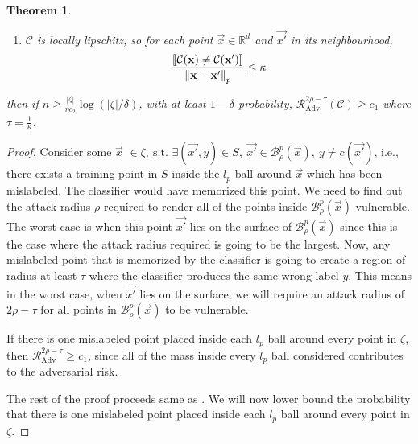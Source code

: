\documentclass[12pt, oneside]{book}
\newtheorem{theorem}{Theorem}
\begin{document}
\begin{theorem}
\begin{enumerate}
        \item $\mathcal{C}$ is locally lipschitz, so for each point $\vec{x} \in
        \mathbb{R}^d$ and $\vec{x'}$ in its neighbourhood,
            \begin{equation*}
                \frac{\llbracket \mathcal{C}({\mathbf{x}}) \neq \mathcal{C}({\mathbf{x'}}) \rrbracket}
                    {\mathrm{\left\lVert{\mathbf{x}} - {\mathbf{x'}}\right\rVert}_p} 
                \leq \kappa
            \end{equation*}
    \end{enumerate}
    then if $n \geq \frac{|\zeta|}{\eta c_2} \log (|\zeta|/\delta)$, with at
    least $1-\delta$ probability,
    $\mathcal{R}_{\text{Adv}}^{2\rho-\tau}(\mathcal{C}) \geq c_1$ where $\tau =
    \frac{1}{\kappa}$.
\end{theorem}
\begin{proof}
Consider some $\vec{x}$
$
\in \zeta, ~\text{s.t. } \exists (\vec{x'}, y) \in S,~\vec{x'}
\in \mathcal{B}_\rho^p(\vec{x}),~y \neq c(\vec{x'})
$,
i.e., there exists a training point in $S$ inside the $l_p$ ball around
$\vec{x}$ which has been mislabeled. The classifier would have memorized this
point. We need to find out the attack radius $\rho$ required to render all of
the points inside $\mathcal{B}_\rho^p(\vec{x})$ vulnerable. The worst case is
when this point $\vec{x'}$ lies on the surface of $\mathcal{B}_\rho^p(\vec{x})$
since this is the case where the attack radius required is going to be the
largest. Now, any mislabeled point that is memorized by the classifier is going
to create a region of radius at least $\tau$ where the classifier produces the
same wrong label $y$. This means in the worst case, when $\vec{x'}$ lies on the
surface, we will require an attack radius of $2\rho-\tau$ for all points in
$\mathcal{B}_\rho^p(\vec{x})$ to be vulnerable. 

If there is one mislabeled point placed inside each $l_p$ ball around every
point in $\zeta$, then $\mathcal{R}_{\text{Adv}}^{2\rho-\tau} \geq c_1$, since
all of the mass inside every $l_p$ ball considered contributes to the
adversarial risk. 

The rest of the proof proceeds same as \citep{sanyal2021how}. We will now lower
bound the probability that there is one mislabeled point placed inside each
$l_p$ ball around every point in $\zeta$.


\end{proof}
\end{document}
